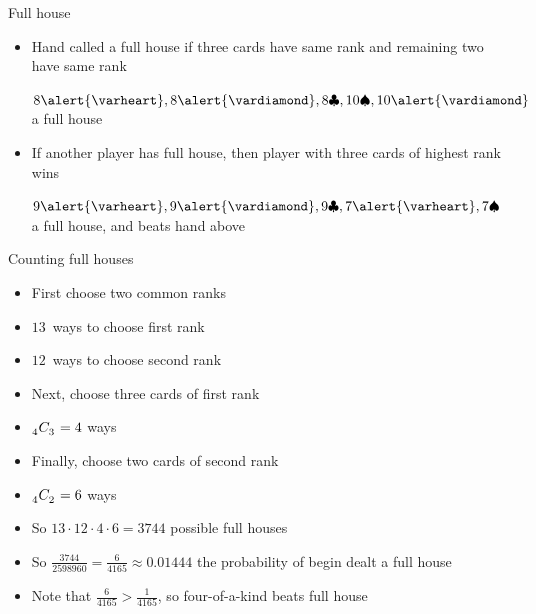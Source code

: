 \documentclass[handout]{beamer}
\theoremstyle{definition}
\newcommand\ncr[2]{\tensor[_{#1}]C{_{#2}}}
\newcommand{\hs}{\alert{\varheart}}
\newcommand{\ds}{\alert{\vardiamond}}
\newcommand{\s}{\spadesuit}
\newcommand{\cs}{\clubsuit}
\begin{document}
\begin{frame}{Full house}
\begin{itemize}
\item Hand called a \alert{full house} if three
cards have same rank and remaining two have same rank
\begin{example} $8\hs,8\ds,8\cs,10\s,10\ds$ a full house\end{example}
\item If another player has full house, then player with
three cards of highest rank wins
\begin{example} $9\hs,9\ds,9\cs,7\hs,7\s$ a full house,
and beats hand above\end{example}
\end{itemize}
\end{frame}

\begin{frame}{Counting full houses}
\begin{itemize}
\item First choose two common ranks
\item $13$~ways to choose first rank
\item $12$~ways to choose second rank
\item Next, choose three cards of first rank
\item $\ncr{4}{3}=4$ ways
\item Finally, choose two cards of second rank
\item $\ncr{4}{2}=6$ ways
\item So $13\cdot 12\cdot 4\cdot 6=3744$ possible full houses
\item So $\frac{3744}{2598960}=\frac{6}{4165}\approx 0.01444$
the probability of begin dealt a full house
\item Note that $\frac{6}{4165}>\frac{1}{4165}$,
so four-of-a-kind beats full house
\end{itemize}
\end{frame}
\end{document}
